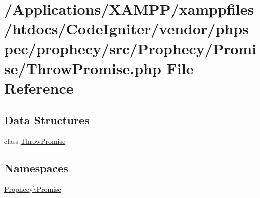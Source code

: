 \hypertarget{_throw_promise_8php}{}\section{/\+Applications/\+X\+A\+M\+P\+P/xamppfiles/htdocs/\+Code\+Igniter/vendor/phpspec/prophecy/src/\+Prophecy/\+Promise/\+Throw\+Promise.php File Reference}
\label{_throw_promise_8php}
\subsection*{Data Structures}
\begin{DoxyCompactItemize}
\item 
class \mbox{\hyperlink{class_prophecy_1_1_promise_1_1_throw_promise}{Throw\+Promise}}
\end{DoxyCompactItemize}
\subsection*{Namespaces}
\begin{DoxyCompactItemize}
\item 
 \mbox{\hyperlink{namespace_prophecy_1_1_promise}{Prophecy\textbackslash{}\+Promise}}
\end{DoxyCompactItemize}
